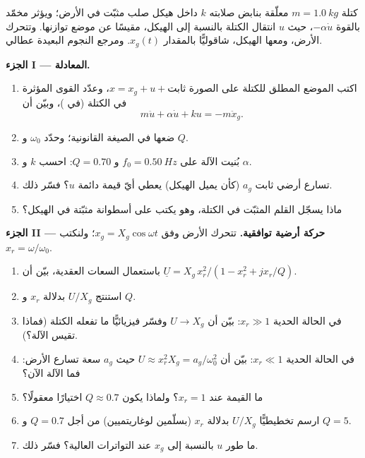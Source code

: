 \begin{problem}
\label{pb:b1:oscillators-resonance:1}
كتلة $m = \qty{1.0}{kg}$ معلّقة بنابض صلابته $k$ داخل
هيكل صلب مثبّت في الأرض؛ ويؤثر مخمّد بالقوة $-\alpha\dot u$، حيث
$u$ انتقال الكتلة بالنسبة إلى الهيكل، مقيسًا
عن موضع توازنها. وتتحرك الأرض، ومعها الهيكل،
شاقوليًّا بالمقدار $x_g(t)$. ومرجع النجوم البعيدة عطالي.

\medskip
\noindent\textbf{الجزء I --- المعادلة.}
\begin{enumerate}
  \item اكتب الموضع المطلق للكتلة على الصورة $x = x_g + u +
        \text{ثابت}$، وعدّد القوى المؤثرة في الكتلة (في )، وبيّن أن
        \[
        m\ddot u + \alpha\dot u + ku = -m\ddot x_g .
        \]
  \item ضعها في الصيغة القانونية؛ وحدّد $\omega_0$ و $Q$.
  \item بُنيت الآلة على $f_0 = \qty{0.50}{Hz}$ و $Q = 0.70$:
        احسب $k$ و $\alpha$.
  \item تسارع أرضي ثابت $a_g$ (كأن يميل الهيكل) يعطي
        أيّ قيمة دائمة $u$؟ فسّر ذلك.
  \item ماذا يسجّل القلم المثبّت في الكتلة، وهو يكتب على أسطوانة
        مثبّتة في الهيكل؟
\end{enumerate}

\medskip
\noindent\textbf{الجزء II --- حركة أرضية توافقية.}
تتحرك الأرض وفق $x_g = X_g\cos\omega t$؛ ولنكتب $x_r = \omega/\omega_0$.
\begin{enumerate}[resume]
  \item باستعمال السعات العقدية، بيّن أن $\underline U = X_g\,x_r^2/
        (1 - x_r^2 + jx_r/Q)$.
  \item استنتج $U/X_g$ بدلالة $x_r$ و $Q$.
  \item في الحالة الحدية $x_r \gg 1$: بيّن أن $U \to X_g$ وفسّر فيزيائيًّا ما
        تفعله الكتلة (فماذا تقيس الآلة؟).
  \item في الحالة الحدية $x_r \ll 1$: بيّن أن $U \approx x_r^2X_g = a_g/\omega_0^2$ حيث
        $a_g$ سعة تسارع الأرض: فما الآلة
        الآن؟
  \item ما القيمة عند $x_r = 1$؟ ولماذا يكون $Q \approx 0.7$ اختيارًا معقولًا؟
  \item ارسم تخطيطيًّا $U/X_g$ بدلالة $x_r$ (بسلّمين لوغاريتميين) من أجل $Q = 0.7$ و
        $Q = 5$.
  \item ما طور $u$ بالنسبة إلى $x_g$ عند التواترات العالية؟ فسّر ذلك.
\end{enumerate}


\end{problem}
